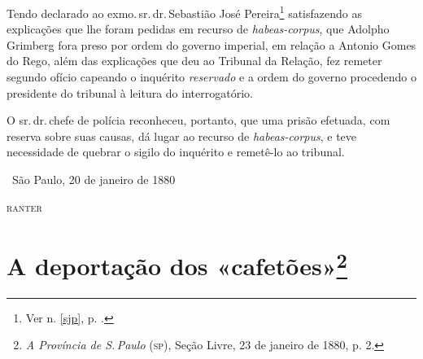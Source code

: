 Tendo declarado ao exmo.\,sr.\,dr.\,Sebastião José Pereira\footnote{Ver n. \ref{sjp}, p. \pageref{sjp}.}
satisfazendo as explicações
que lhe foram pedidas em recurso de \emph{habeas-corpus}, que Adolpho
Grimberg fora preso por ordem do governo imperial, em relação a Antonio
Gomes do Rego, além das explicações que deu ao Tribunal da Relação, fez
remeter segundo ofício capeando o inquérito \emph{reservado} e a ordem
do governo procedendo o presidente do tribunal à leitura do
interrogatório.

O sr.\,dr.\,chefe de polícia reconheceu, portanto, que uma prisão
efetuada, com reserva sobre suas causas, dá lugar ao recurso de
\emph{habeas-corpus}, e teve necessidade de quebrar o sigilo do
inquérito e remetê-lo ao tribunal.\medskip

\hfill\ São Paulo, 20 de janeiro de 1880

\hfill\textsc{ranter}

\chapter{A deportação dos «cafetões»\footnote{\emph{A Província
  de S.\,Paulo} (\textsc{sp}), Seção Livre, 23 de janeiro de 1880, p. 2.}}

